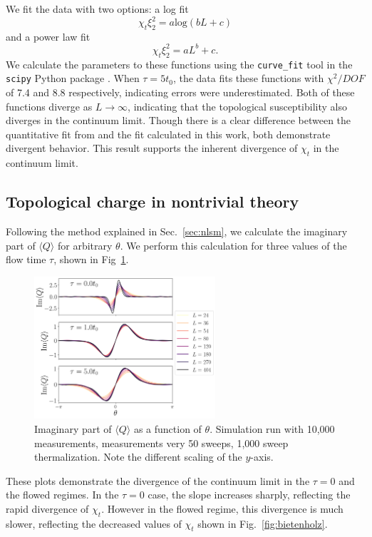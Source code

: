 \documentclass[a4paper,11pt]{article}
\newcommand{\logchi}{7.4 }
\newcommand{\powchi}{8.8 }
\begin{document}
We fit the data with two options: a log fit
\begin{equation}
    \chi_t \xi_2^2 = a \mathrm{log}(b L + c)
\end{equation}
and a power law fit
\begin{equation}
    \chi_t \xi_2^2 = a L^b + c.
\end{equation}
We calculate the parameters to these functions using the \texttt{curve\_fit} tool in the \texttt{scipy} Python package \cite{virtanen2020}. When $\tau=5t_0$, the data fits these functions with $\chi^2/DOF$ of \logchi and \powchi respectively, indicating errors were underestimated. Both of these functions diverge as $L\rightarrow \infty$, indicating that the topological susceptibility also diverges in the continuum limit. Though there is a clear difference between the quantitative fit from \cite{bietenholz2018} and the fit calculated in this work, both demonstrate divergent behavior. This result supports the inherent divergence of $\chi_t$ in the continuum limit.


\subsection{Topological charge in nontrivial theory}

Following the method explained in Sec.~\ref{sec:nlsm}, we calculate the imaginary part of $\langle Q \rangle$ for arbitrary $\theta$. We perform this calculation for three values of the flow time $\tau$, shown in Fig~\ref{fig:theta}.
\begin{figure}[h!]
    \centering
      \includegraphics[width=0.6\textwidth]{theta-small.png}
      \caption{\label{fig:theta} Imaginary part of $\langle Q \rangle$ as a function of $\theta$. Simulation run with 10,000 measurements, measurements very 50 sweeps, 1,000 sweep thermalization. Note the different scaling of the $y$-axis.}
\end{figure}
These plots demonstrate the divergence of the continuum limit in the $\tau=0$ and the flowed regimes. In the $\tau=0$ case, the slope increases sharply, reflecting the rapid divergence of $\chi_t$. However in the flowed regime, this divergence is much slower, reflecting the decreased values of $\chi_t$ shown in Fig.~\ref{fig:bietenholz}.
\end{document}
